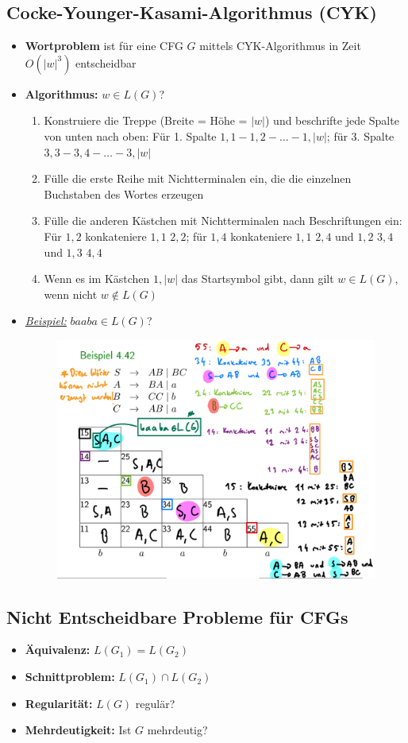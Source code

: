 \documentclass[ieeetran]{article}
\begin{document}
\subsection{Cocke-Younger-Kasami-Algorithmus (CYK)} %
\label{sub:cocke_younger_kasami_algorithmus_cYK_}
\begin{itemize}
  \item \textbf{Wortproblem} ist für eine CFG $G$ mittels CYK-Algorithmus in Zeit $O(|w|^3)$ entscheidbar
	\item \textbf{Algorithmus:} $w \in L(G)$?
		\begin{enumerate}
		  \item Konstruiere die Treppe (Breite = Höhe = $|w|$) und beschrifte jede Spalte von unten nach oben: Für 1. Spalte $1,1-1,2-\ldots-1,|w|$; für 3. Spalte $3,3-3,4-\ldots-3,|w|$
		\item Fülle die erste Reihe mit Nichtterminalen ein, die die einzelnen Buchstaben des Wortes erzeugen
		\item Fülle die anderen Kästchen mit Nichtterminalen nach Beschriftungen ein: Für $1,2$ konkateniere $1,1$ $2,2$; für $1,4$ konkateniere $1,1$ $2,4$ und $1,2$ $3,4$ und $1,3$ $4,4$
		\item Wenn es im Kästchen $1, |w|$ das Startsymbol gibt, dann gilt $w \in L(G)$, wenn nicht $w \not\in L(G)$

		\end{enumerate}

	\item \textit{\underline{Beispiel:}} $baaba \in L(G)$?
		\begin{figure}[h!]
		  \centering
		  \includegraphics[width=0.5\linewidth]{cykexample}
		  \label{fig:cykexample}
		\end{figure}
\end{itemize}

\subsection{Nicht Entscheidbare Probleme für CFGs} %
\label{sub:nicht_entscheidbare_probleme_für_cFGs}
\begin{itemize}
  \item \textbf{Äquivalenz:} $L(G_1) = L(G_2)$
\item \textbf{Schnittproblem:} $L(G_1) \cap L(G_2)$
\item \textbf{Regularität:} $L(G)$ regulär?
\item \textbf{Mehrdeutigkeit:} Ist $G$ mehrdeutig?
\end{itemize}
\end{document}
